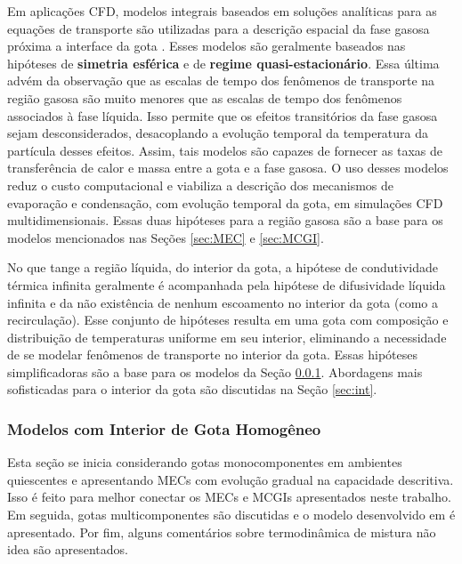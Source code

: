 Em aplicações CFD, modelos integrais baseados em soluções analíticas para as equações de transporte são utilizadas para a descrição espacial da fase gasosa próxima a interface da gota \cite{Sazhin2006}.
Esses modelos são geralmente baseados nas hipóteses de \textbf{simetria esférica} e de \textbf{regime quasi-estacionário}.
Essa última advém da observação que as escalas de tempo dos fenômenos de transporte na região gasosa são muito menores que as escalas de tempo dos fenômenos associados à fase líquida. Isso permite que os efeitos transitórios da fase gasosa sejam desconsiderados, desacoplando a evolução temporal da temperatura da partícula desses efeitos. 
Assim, tais modelos são capazes de fornecer as taxas de transferência de calor e massa entre a gota e a fase gasosa.
O uso desses modelos reduz o custo computacional e viabiliza a descrição dos mecanismos de evaporação e condensação, com evolução temporal da gota, em simulações CFD multidimensionais.
Essas duas hipóteses para a região gasosa são a base para os modelos mencionados nas Seções \ref{sec:MEC} e \ref{sec:MCGI}.

No que tange a região líquida, do interior da gota, a hipótese de condutividade térmica infinita geralmente é acompanhada pela hipótese de difusividade líquida infinita e da não existência de nenhum escoamento no interior da gota (como a recirculação).
Esse conjunto de hipóteses resulta em uma gota com composição e distribuição de temperaturas uniforme em seu interior, eliminando a necessidade de se modelar fenômenos de transporte no interior da gota.
Essas hipóteses simplificadoras são a base para os modelos da Seção \ref{sec:RMM}.
Abordagens mais sofisticadas para o interior da gota são discutidas na Seção \ref{sec:int}.


\subsubsection{Modelos com Interior de Gota Homogêneo} \label{sec:RMM}

Esta seção se inicia considerando gotas monocomponentes em ambientes quiescentes e apresentando MECs com evolução gradual na capacidade descritiva.
Isso é feito para melhor conectar os MECs e MCGIs apresentados neste trabalho.
Em seguida, gotas multicomponentes são discutidas e o modelo desenvolvido em \cite{SacomanoF2022IJHMT} é apresentado.
Por fim, alguns comentários sobre termodinâmica de mistura não idea são apresentados.


